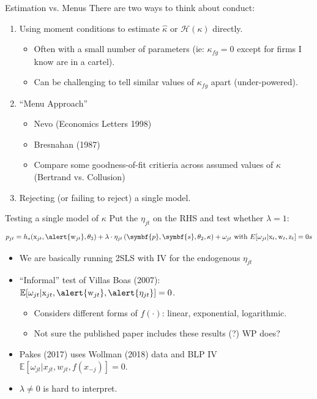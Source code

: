 \documentclass[aspectratio=169,10pt]{beamer}
\begin{document}
\begin{frame}{Estimation vs. Menus}
There are two ways to think about conduct:
\begin{enumerate}
\item Using moment conditions to estimate $\widehat{\kappa}$ or $\mathcal{H}(\kappa)$ directly.
\begin{itemize}
\item Often with a small number of parameters (ie: $\kappa_{fg}=0$ except for firms I know are in a cartel).
\item Can be challenging to tell similar values of $\kappa_{fg}$ apart (under-powered).
\end{itemize}
\item ``Menu Approach''
\begin{itemize}
\item  Nevo (Economics Letters 1998)
\item Bresnahan (1987)
\item Compare some goodness-of-fit critieria across assumed values of $\kappa$ (Bertrand vs. Collusion)
  \end{itemize}
\item Rejecting (or failing to reject) a single model.
  \end{enumerate}
\end{frame}


\begin{frame}{Testing a single model of $\kappa$}
Put the $\eta_{jt}$ on the RHS and test whether $\lambda=1$:
\begin{align*}
 p_{jt} = h_s(\textrm{x}_{jt}, \alert{\textrm{w}_{jt}},\theta_3) + \lambda \cdot \eta_{jt}\left(\symbf{p},\symbf{s},\theta_2,\kappa \right)+  \omega_{jt} \text{ with }
 E[\omega_{jt} | \textrm{x}_{t},\textrm{w}_{t},\textrm{z}_{t}]=0s
\end{align*}
\vspace{-0.25cm}
\begin{itemize}
\item We are basically running 2SLS with IV for the endogenous $\eta_{jt}$
\item ``Informal'' test of Villas Boas (2007): $\mathbb{E}[\omega_{jt} | \textrm{x}_{jt},\alert{\textrm{w}_{jt}},\alert{\eta_{jt}}]=0$.
\begin{itemize}
\item Considers different forms of $f(\cdot)$: linear, exponential, logarithmic.
\item Not sure the published paper includes these results (?) WP does?
  \end{itemize}
\item Pakes (2017) uses Wollman (2018) data and BLP IV $\mathbb{E}[\omega_{jt} | x_{jt},w_{jt},f(x_{-j})]=0$.
\item $\lambda \neq 0$ is hard to interpret.
\end{itemize}
\end{frame}
\end{document}
